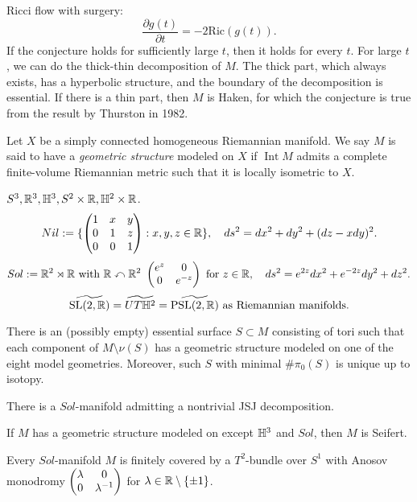\documentclass{../../../small}
\DeclareMathOperator{\Int}{Int}
\begin{document}
Ricci flow with surgery:
\[\frac{\partial g(t)}{\partial t}=-2\mathrm{Ric}(g(t)).\]
If the conjecture holds for sufficiently large $t$, then it holds for every $t$.
For large $t$, we can do the thick-thin decomposition of $M$.
The thick part, which always exists, has a hyperbolic structure, and the boundary of the decomposition is essential.
If there is a thin part, then $M$ is Haken, for which the conjecture is true from the result by Thurston in 1982.

Let $X$ be a simply connected homogeneous Riemannian manifold.
We say $M$ is said to have a \emph{geometric structure} modeled on $X$ if $\Int M$ admits a complete finite-volume Riemannian metric such that it is locally isometric to $X$.

$S^3,\mathbb{R}^3,\mathbb{H}^3,S^2\times\mathbb{R},\mathbb{H}^2\times\mathbb{R}$.
\[Nil:=\{\begin{pmatrix}1&x&y\\0&1&z\\0&0&1\end{pmatrix}:x,y,z\in\mathbb{R}\},\quad ds^2=dx^2+dy^2+(dz-xdy)^2.\]
\[Sol:=\mathbb{R}^2\rtimes\mathbb{R}\text{ with }\mathbb{R}\curvearrowleft\mathbb{R}^2\ \begin{pmatrix}e^z&0\\0&e^{-z}\end{pmatrix}\text{ for }z\in\mathbb{R},\quad ds^2=e^{2z}dx^2+e^{-2z}dy^2+dz^2.\]
\[\widetilde{\mathrm{SL}(2,\mathbb{R})}=\widetilde{UT\mathbb{H}^2}=\widetilde{\mathrm{PSL}(2,\mathbb{R})}\text{ as Riemannian manifolds.}\]


\begin{thm}
There is an (possibly empty) essential surface $S\subset M$ consisting of tori such that each component of $M\setminus\nu(S)$ has a geometric structure modeled on one of the eight model geometries.
Moreover, such $S$ with minimal $\#\pi_0(S)$ is unique up to isotopy.
\end{thm}
\begin{rmk*}
There is a $Sol$-manifold admitting a nontrivial JSJ decomposition.
\end{rmk*}
\begin{prop}
If $M$ has a geometric structure modeled on except $\mathbb{H}^3$ and $Sol$, then $M$ is Seifert.
\end{prop}
\begin{prop}
Every $Sol$-manifold $M$ is finitely covered by a $T^2$-bundle over $S^1$ with Anosov monodromy $\begin{pmatrix}\lambda&0\\0&\lambda^{-1}\end{pmatrix}$ for $\lambda\in\mathbb{R}\setminus\{\pm1\}$.
\end{prop}
\end{document}

